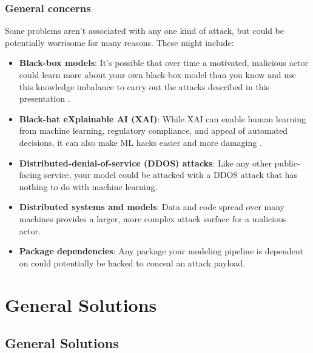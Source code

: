 \documentclass[11pt,
               aspectratio=169,
               hyperref={colorlinks}
               ]{beamer}
\begin{document}
			\begin{frame}[t, allowframebreaks]	
		
				\frametitle{General concerns}	
			
				\small Some problems aren’t associated with any one kind of attack, but could be potentially worrisome for many reasons. These might include:
			
				\begin{itemize}
					\item \textbf{Black-box models}: It’s possible that over time a motivated, malicious actor could learn more about your own black-box model than you know and use this knowledge imbalance to carry out the attacks described in this presentation \cite{papernot2018marauder}.
					\item \textbf{Black-hat eXplainable AI (XAI)}:  While XAI can enable human learning from machine learning, regulatory compliance, and appeal of automated decisions, it can also make ML hacks easier and more damaging \cite{shokri2019privacy}.
					\item \textbf{Distributed-denial-of-service (DDOS) attacks}: Like any other public-facing service, your model could be attacked with a DDOS attack that has nothing to do with machine learning.
					\item \textbf{Distributed systems and models}: Data and code spread over many machines provides a larger, more complex attack surface for a malicious actor.
					\item \textbf{Package dependencies}: Any package your modeling pipeline is dependent on could potentially be hacked to conceal an attack payload.
				\end{itemize}
				\normalsize

			\end{frame}

	\section{General Solutions}
	
		\subsection{General Solutions}
	
\end{document}
